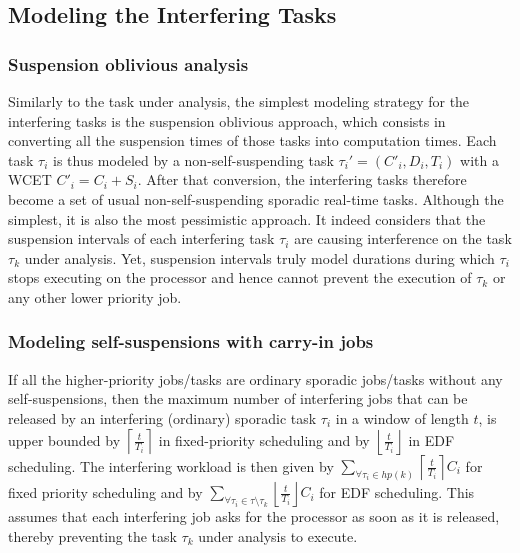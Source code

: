 \subsection{Modeling the Interfering Tasks}
\label{sec:model-interfering}



\subsubsection{Suspension oblivious analysis}
\label{sec:model-interfering-oblivious}

Similarly to the task under analysis, the simplest modeling strategy for the interfering tasks is the suspension oblivious approach, which consists in converting all the suspension times of those tasks into computation times. Each task $\tau_i$ is thus modeled by a non-self-suspending task $\tau_i' = (C'_i, D_i, T_i)$ with a WCET $C'_i = C_i+S_i$. After that conversion, the interfering tasks therefore become a set of usual non-self-suspending sporadic real-time tasks. Although the simplest, it is also the most pessimistic approach. It indeed considers that the suspension intervals of each interfering task $\tau_i$ are causing interference on the task $\tau_k$ under analysis. Yet, suspension intervals truly model durations during which $\tau_i$ stops executing on the processor and hence cannot prevent the execution of $\tau_k$ or any other lower priority job.


\subsubsection{Modeling self-suspensions with carry-in jobs}
\label{sec:model-carry-in}

If all the higher-priority jobs/tasks are ordinary sporadic jobs/tasks without any self-suspensions, then
the maximum number of interfering jobs that can be released by an interfering (ordinary) sporadic task $\tau_i$ in a window of length $t$, is upper bounded by $\left\lceil \frac{t}{T_i} \right\rceil$ in fixed-priority scheduling and by $\left\lfloor \frac{t}{T_i} \right\rfloor$ in EDF scheduling. The interfering workload is then given by $\sum_{\forall \tau_i \in hp(k)} \left\lceil \frac{t}{T_i} \right\rceil C_i$ for fixed priority scheduling and by $\sum_{\forall \tau_i \in \tau \setminus \tau_k} \left\lfloor \frac{t}{T_i} \right\rfloor C_i$ for EDF scheduling. This assumes that each interfering job asks for the processor as soon as it is released, thereby preventing the task $\tau_k$ under analysis to execute.

